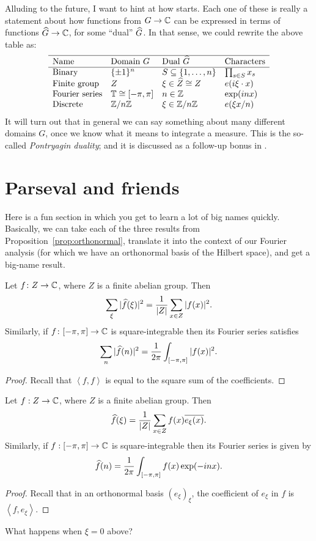 Alluding to the future, I want to hint at how  starts.
Each one of these is really a statement
about how functions from $G \to \mathbb C$
can be expressed in terms of functions $\widehat G \to \mathbb C$,
for some ``dual'' $\widehat G$.
In that sense, we could rewrite the above table as:
\[
	\begin{array}{llll}
		\hline
		\text{Name} & \text{Domain }G & \text{Dual }\widehat G 
			& \text{Characters} \\ \hline
		\text{Binary} & \{\pm1\}^n
			& S \subseteq \left\{ 1, \dots, n \right\}
			& \prod_{s \in S} x_s \\
		\text{Finite group} & Z
			& \xi \in \widehat Z \cong Z & e( i \xi \cdot x) \\
		\text{Fourier series} & \mathbb T \cong [-\pi, \pi]  & n \in \mathbb Z
			& \exp(inx) \\
		\text{Discrete} & \mathbb Z/n\mathbb Z & \xi \in \mathbb Z/n\mathbb Z
			& e(\xi x / n) \\
	\end{array}
\]
It will turn out that in general
we can say something about many different domains $G$,
once we know what it means to integrate a measure.
This is the so-called \emph{Pontryagin duality};
and it is discussed as a follow-up bonus in .

\section{Parseval and friends}
Here is a fun section in which you get to learn a lot of big names quickly.
Basically, we can take each of the three results
from Proposition~\ref{prop:orthonormal},
translate it into the context of our Fourier analysis
(for which we have an orthonormal basis of the Hilbert space),
and get a big-name result.

\begin{corollary}
	Let $f \colon Z \to \mathbb C$, where $Z$ is a finite abelian group.
	Then \[ \sum_\xi |\widehat f(\xi)|^2 = \frac{1}{|Z|} \sum_{x \in Z} |f(x)|^2. \]
	Similarly, if $f \colon [-\pi, \pi] \to \mathbb C$ is square-integrable then
	its Fourier series satisfies
	\[ \sum_n |\widehat f(n)|^2 = \frac{1}{2\pi} \int_{[-\pi, \pi]} |f(x)|^2. \]
\end{corollary}
\begin{proof}
Recall that $\left< f,f\right>$ is equal to the
square sum of the coefficients.
\end{proof}

\begin{corollary}
	Let $f : Z \to \mathbb C$, where $Z$ is a finite abelian group.
	Then \[ \widehat f(\xi) = \frac{1}{|Z|} \sum_{x \in Z} f(x) \overline{e_\xi(x)}. \]
	Similarly, if $f : [-\pi, \pi] \to \mathbb C$ is square-integrable then
	its Fourier series is given by
	\[ \widehat f(n) = \frac{1}{2\pi} \int_{[-\pi, \pi]} f(x) \exp(-inx). \]
\end{corollary}
\begin{proof}
Recall that in an orthonormal basis $(e_\xi)_\xi$,
the coefficient of $e_\xi$ in $f$ is $\left< f, e_\xi\right>$.
\end{proof}
\begin{ques}
	What happens when $\xi = 0$ above?
\end{ques}

